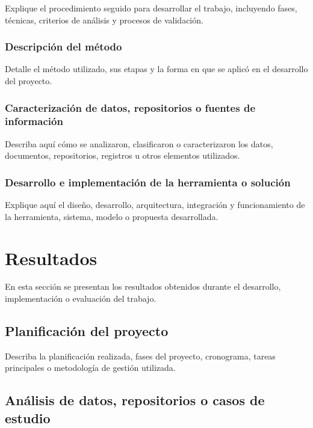\documentclass[12pt]{article}
\begin{document}
Explique el procedimiento seguido para desarrollar el trabajo, incluyendo fases, técnicas, criterios de análisis y procesos de validación.

\subsubsection{Descripción del método}

Detalle el método utilizado, sus etapas y la forma en que se aplicó en el desarrollo del proyecto.

\subsubsection{Caracterización de datos, repositorios o fuentes de información}

Describa aquí cómo se analizaron, clasificaron o caracterizaron los datos, documentos, repositorios, registros u otros elementos utilizados.

\subsubsection{Desarrollo e implementación de la herramienta o solución}

Explique aquí el diseño, desarrollo, arquitectura, integración y funcionamiento de la herramienta, sistema, modelo o propuesta desarrollada.

\newpage


\section{Resultados}

En esta sección se presentan los resultados obtenidos durante el desarrollo, implementación o evaluación del trabajo.

\subsection{Planificación del proyecto}

Describa la planificación realizada, fases del proyecto, cronograma, tareas principales o metodología de gestión utilizada.

\subsection{Análisis de datos, repositorios o casos de estudio}
\end{document}
